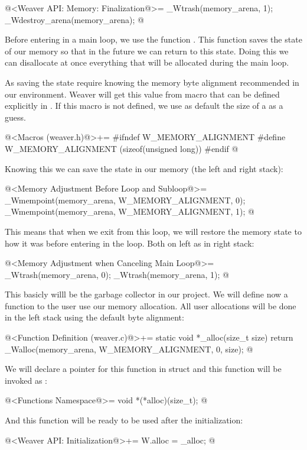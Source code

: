 \iniciocodigo
@<Weaver API: Memory: Finalization@>=
_Wtrash(memory_arena, 1);
_Wdestroy_arena(memory_arena);
@
\fimcodigo

Before entering in a main loop, we use the
function . This function saves the state of
our memory so that in the future we can return to this state. Doing
this we can disallocate at once everything that will be allocated
during the main loop.

As saving the state require knowing the memory byte alignment
recommended in our environment. Weaver will get this value from
macro  that can be defined explicitly
in . If this macro is not defined, we use as
default the size of a  as a guess.

\iniciocodigo
@<Macros (weaver.h)@>+=
#ifndef W_MEMORY_ALIGNMENT
#define W_MEMORY_ALIGNMENT (sizeof(unsigned long))
#endif
@
\fimcodigo

Knowing this we can save the state in our memory (the left and right
stack):

\iniciocodigo
@<Memory Adjustment Before Loop and Subloop@>=
_Wmempoint(memory_arena, W_MEMORY_ALIGNMENT, 0);
_Wmempoint(memory_arena, W_MEMORY_ALIGNMENT, 1);
@
\fimcodigo

This means that when we exit from this loop, we will restore the
memory state to how it was before entering in the loop. Both on left
as in right stack:

\iniciocodigo
@<Memory Adjustment when Canceling Main Loop@>=
_Wtrash(memory_arena, 0);
_Wtrash(memory_arena, 1);
@
\fimcodigo

This basicly willl be the garbage collector in our project. We will
define now a function to the user use our memory allocation. All user
allocations will be done in the left stack using the default byte
alignment:

\iniciocodigo
@<Function Definition (weaver.c)@>+=
static void *_alloc(size_t size){
  return _Walloc(memory_arena, W_MEMORY_ALIGNMENT, 0, size);
}
@
\fimcodigo

We will declare a pointer for this function in struct 
and this function will be invoked as :

\iniciocodigo
@<Functions Namespace@>=
void *(*alloc)(size_t);
@
\fimcodigo

And this function will be ready to be used after the initialization:

\iniciocodigo
@<Weaver API: Initialization@>+=
W.alloc = _alloc;
@
\fimcodigo


